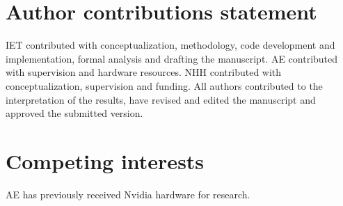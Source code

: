 \documentclass[fleqn,10pt]{wlscirep}
\begin{document}
\section*{Author contributions statement}
IET contributed with conceptualization, methodology, code development and implementation, formal analysis and drafting the manuscript. AE contributed with supervision and hardware resources. NHH contributed with conceptualization, supervision and funding. All authors contributed to the interpretation of the results, have revised and edited the manuscript and approved the submitted version.

\section*{Competing interests}
AE has previously received Nvidia hardware for research.


\end{document}
